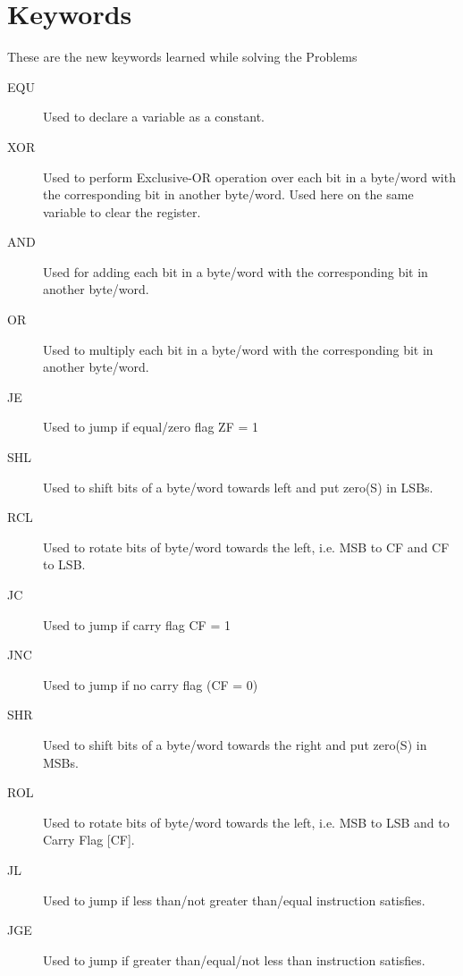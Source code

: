 \documentclass[12pt]{article}
\begin{document}




\section*{Keywords}
These are the new keywords learned while solving the Problems
\begin{description}
    \item[EQU] Used to declare a variable as a constant.
    \item[XOR] Used to perform Exclusive-OR operation over each bit in a byte/word with the corresponding bit in another byte/word. Used here on the same variable to clear the register.
    \item[AND] Used for adding each bit in a byte/word with the corresponding bit in another byte/word.
    \item[OR] Used to multiply each bit in a byte/word with the corresponding bit in another byte/word.
    \item[JE] Used to jump if equal/zero flag ZF = 1
    \item[SHL] Used to shift bits of a byte/word towards left and put zero(S) in LSBs.
    \item[RCL] Used to rotate bits of byte/word towards the left, i.e. MSB to CF and CF to LSB.
    \item[JC] Used to jump if carry flag CF = 1
    \item[JNC] Used to jump if no carry flag (CF = 0)
    \item[SHR] Used to shift bits of a byte/word towards the right and put zero(S) in MSBs.
    \item[ROL] Used to rotate bits of byte/word towards the left, i.e. MSB to LSB and to Carry Flag [CF].
    \item[JL] Used to jump if less than/not greater than/equal instruction satisfies.
    \item[JGE]  Used to jump if greater than/equal/not less than instruction satisfies.
\end{description}
\end{document}
